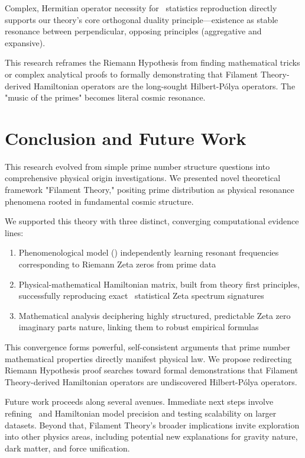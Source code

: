 \documentclass[11pt,a4paper]{article}
\newcommand{\GSE}{\text{GSE}}
\newcommand{\GUE}{\text{GUE}}
\begin{document}
Complex, Hermitian operator necessity for \GUE\ statistics reproduction directly supports our theory's core orthogonal duality principle—existence as stable resonance between perpendicular, opposing principles (aggregative and expansive).

This research reframes the Riemann Hypothesis from finding mathematical tricks or complex analytical proofs to formally demonstrating that Filament Theory-derived Hamiltonian operators are the long-sought Hilbert-Pólya operators. The "music of the primes" becomes literal cosmic resonance.

\section{Conclusion and Future Work}

This research evolved from simple prime number structure questions into comprehensive physical origin investigations. We presented novel theoretical framework "Filament Theory," positing prime distribution as physical resonance phenomena rooted in fundamental cosmic structure.

We supported this theory with three distinct, converging computational evidence lines:

\begin{enumerate}
\item Phenomenological model (\GSE) independently learning resonant frequencies corresponding to Riemann Zeta zeros from prime data
\item Physical-mathematical Hamiltonian matrix, built from theory first principles, successfully reproducing exact \GUE\ statistical Zeta spectrum signatures  
\item Mathematical analysis deciphering highly structured, predictable Zeta zero imaginary parts nature, linking them to robust empirical formulas
\end{enumerate}

This convergence forms powerful, self-consistent arguments that prime number mathematical properties directly manifest physical law. We propose redirecting Riemann Hypothesis proof searches toward formal demonstrations that Filament Theory-derived Hamiltonian operators are undiscovered Hilbert-Pólya operators.

Future work proceeds along several avenues. Immediate next steps involve refining \GSE\ and Hamiltonian model precision and testing scalability on larger datasets. Beyond that, Filament Theory's broader implications invite exploration into other physics areas, including potential new explanations for gravity nature, dark matter, and force unification.
\end{document}
